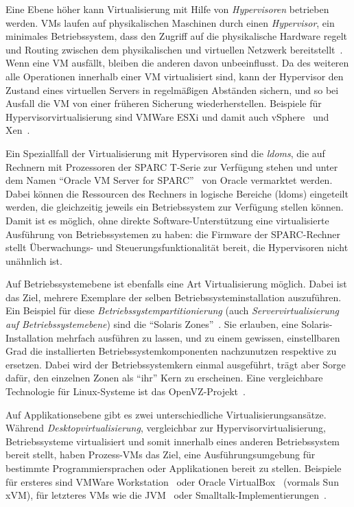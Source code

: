 Eine Ebene höher kann Virtualisierung mit Hilfe von
\emph{Hypervisoren} betrieben werden. \acfp{VM} laufen auf
physikalischen Maschinen durch einen \emph{Hypervisor}, ein minimales
Betriebssystem, dass den Zugriff auf die physikalische Hardware regelt
und Routing zwischen dem physikalischen und virtuellen Netzwerk
bereitstellt~\cite{tanenbaum1992modern}. Wenn eine \ac{VM} ausfällt,
bleiben die anderen davon unbeeinflusst. Da des weiteren alle
Operationen innerhalb einer \ac{VM} virtualisiert sind, kann der Hypervisor
den Zustand eines virtuellen Servers in regelmäßigen Abständen
sichern, und so bei Ausfall die \ac{VM} von einer früheren Sicherung
wiederherstellen. Beispiele für Hypervisorvirtualisierung sind VMWare
ESXi und damit auch vSphere~\cite{:Free-VMware-vSp} und Xen~\cite{Barham:2003:XAV:945445.945462}.

Ein Speziallfall der Virtualisierung mit Hypervisoren sind die
\emph{\acfp{ldom}}, die auf Rechnern mit Prozessoren der SPARC T-Serie
zur Verfügung stehen und unter dem Namen "`Oracle VM Server for
SPARC"'~\cite{Corporation:Oracle-VM-Serve} von Oracle vermarktet
werden. Dabei können die Ressourcen des Rechners in logische Bereiche
(\aclp{ldom}) eingeteilt werden, die gleichzeitig jeweils ein
Betriebssystem zur Verfügung stellen können. Damit ist es möglich,
ohne direkte Software-Unterstützung eine virtualisierte Ausführung
von Betriebssystemen zu haben: die Firmware der SPARC-Rechner stellt
Überwachungs- und Steuerungsfunktionalität bereit, die Hypervisoren
nicht unähnlich ist.

Auf Betriebssystemebene ist ebenfalls eine Art Virtualisierung
möglich. Dabei ist das Ziel, mehrere Exemplare der selben
Betriebssysteminstallation auszuführen. Ein Beispiel für diese
\emph{Betriebssystempartitionierung} (auch \emph{Servervirtualisierung
  auf Betriebssystemebene}) sind die "`Solaris
Zones"'~\cite{price2004solaris}. Sie erlauben, eine
Solaris-Installation mehrfach ausführen zu lassen, und zu einem
gewissen, einstellbaren Grad die installierten
Betriebssystemkomponenten nachzunutzen respektive zu ersetzen. Dabei
wird der Betriebssystemkern einmal ausgeführt, trägt aber Sorge dafür,
den einzelnen Zonen als "`ihr"' Kern zu erscheinen. Eine vergleichbare
Technologie für Linux-Systeme ist das
OpenVZ-Projekt~\cite{ahmed2008server}.

Auf Applikationsebene gibt es zwei unterschiedliche
Virtualisierungsansätze. Während \emph{Desktopvirtualisierung},
vergleichbar zur Hypervisorvirtualisierung, Betriebssysteme
virtualisiert und somit innerhalb eines anderen Betriebssystem bereit
stellt, haben Prozess-\acp{VM} das Ziel, eine Ausführungsumgebung für
bestimmte Programmiersprachen oder Applikationen bereit zu stellen.
Beispiele für ersteres sind VMWare
Workstation~\cite{VMWare-Inc:VMware-Workstat} oder Oracle
VirtualBox~\cite{Oracle-Corporation:VirtualBox} (vormals Sun xVM), für
letzteres \acp{VM} wie die
JVM~\cite{Sun-Developer-Network2003:The-Java-Virtua} oder
Smalltalk-Implementierungen~\cite{ansiSmalltalk}.

